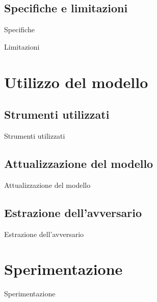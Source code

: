 \documentclass[9pt]{beamer}
\begin{document}
        \subsection{Specifiche e limitazioni}
            \begin{frame}{Specifiche}
            \end{frame}
            
            \begin{frame}{Limitazioni}
            \end{frame}
    
    \section{Utilizzo del modello}
    
        \subsection{Strumenti utilizzati}
            \begin{frame}{Strumenti utilizzati}
            \end{frame}
    
        \subsection{Attualizzazione del modello}
            \begin{frame}{Attualizzazione del modello}
            \end{frame}
            
        \subsection{Estrazione dell'avversario}
            \begin{frame}{Estrazione dell'avversario}
            \end{frame}
            
    \section{Sperimentazione}
    
        \begin{frame}{Sperimentazione}
        \end{frame}
\end{document}
